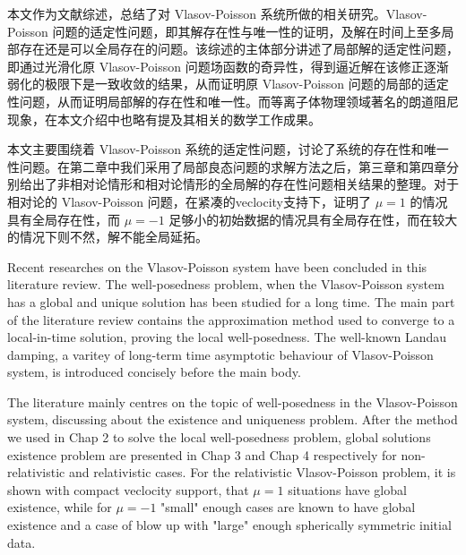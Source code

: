 \begin{cabstract}
  本文作为文献综述，总结了对 Vlasov-Poisson 系统所做的相关研究。Vlasov-Poisson 问题的适定性问题，即其解存在性与唯一性的证明，及解在时间上至多局部存在还是可以全局存在的问题。该综述的主体部分讲述了局部解的适定性问题，即通过光滑化原 Vlasov-Poisson 问题场函数的奇异性，得到逼近解在该修正逐渐弱化的极限下是一致收敛的结果，从而证明原 Vlasov-Poisson 问题的局部的适定性问题，从而证明局部解的存在性和唯一性。而等离子体物理领域著名的朗道阻尼现象，在本文介绍中也略有提及其相关的数学工作成果。

  本文主要围绕着 Vlasov-Poisson 系统的适定性问题，讨论了系统的存在性和唯一性问题。在第二章中我们采用了局部良态问题的求解方法之后，第三章和第四章分别给出了非相对论情形和相对论情形的全局解的存在性问题相关结果的整理。对于相对论的 Vlasov-Poisson 问题，在紧凑的veclocity支持下，证明了 $\mu=1$ 的情况具有全局存在性，而 $\mu=-1$  足够小的初始数据的情况具有全局存在性，而在较大的情况下则不然，解不能全局延拓。
  
  
\end{cabstract}


\begin{eabstract}
Recent researches on the Vlasov-Poisson system have been concluded in this literature review. The well-posedness problem, when the Vlasov-Poisson system has a global and unique solution has been studied for a long time. The main part of the literature review contains the approximation method used to converge to a local-in-time solution, proving the local well-posedness.  The well-known Landau damping, a varitey of long-term time asymptotic behaviour of Vlasov-Poisson system, is introduced concisely before the main body.

The literature mainly centres on the topic of well-posedness in the Vlasov-Poisson system, discussing about the existence and uniqueness problem. After the method we used in Chap 2 to solve the local well-posedness problem, global solutions existence problem are presented in Chap 3 and Chap 4 respectively for non-relativistic and relativistic cases. For the relativistic Vlasov-Poisson problem, it is shown with compact veclocity support, that $\mu=1$ situations have global existence, while for $\mu=-1$ "small" enough cases are known to have global existence and a case of blow up with "large" enough spherically symmetric initial data. 


\end{eabstract}

  